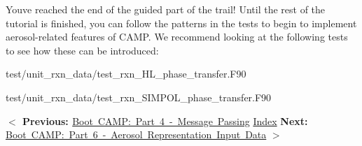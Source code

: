 You\textquotesingle{}ve reached the end of the guided part of the trail! Until the rest of the tutorial is finished, you can follow the patterns in the tests to begin to implement aerosol-\/related features of CAMP. We recommend looking at the following tests to see how these can be introduced\+:


\begin{DoxyItemize}
\item {\ttfamily test/unit\+\_\+rxn\+\_\+data/test\+\_\+rxn\+\_\+\+HL\+\_\+phase\+\_\+transfer.\+F90}
\item {\ttfamily test/unit\+\_\+rxn\+\_\+data/test\+\_\+rxn\+\_\+\+SIMPOL\+\_\+phase\+\_\+transfer.\+F90}
\end{DoxyItemize}

 {\bfseries{ \texorpdfstring{$<$}{<} Previous\+: }} \mbox{\hyperlink{camp_tutorial_part_4}{Boot CAMP\+: Part 4 -\/ Message Passing}}  \mbox{\hyperlink{camp_tutorial}{Index}}  {\bfseries{ Next\+: }} \mbox{\hyperlink{camp_tutorial_part_6}{Boot CAMP\+: Part 6 -\/ Aerosol Representation Input Data}} {\bfseries{ \texorpdfstring{$>$}{>} }} 